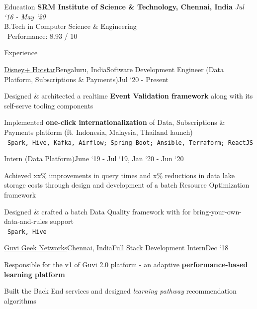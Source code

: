 \documentclass{resume}
\begin{document}
  \begin{rSection}{Education}
    {\bf SRM Institute of Science \& Technology, Chennai, India} \hfill {\em Jul `16 - May `20} \\ 
    { B.Tech in Computer Science \& Engineering } \\
    \textbullet\ Performance: 8.93 / 10
    
  \end{rSection}
  
  \begin{rSection}{Experience}
  
    \begin{rSubsection}{\href{https://tech.hotstar.com/}{Disney+ Hotstar}}{Bengaluru, India}{Software Development Engineer (Data Platform, Subscriptions \& Payments)}{Jul `20 - Present}
      \item Designed \& architected a realtime \textbf{Event Validation framework} along with its self-serve tooling components
      \item Implemented \textbf{one-click internationalization} of Data, Subscriptions \& Payments platform (ft. Indonesia, Malaysia, Thailand launch)\\
    \textbullet\ \texttt{Spark, Hive, Kafka, Airflow; Spring Boot; Ansible, Terraform; ReactJS}
    \end{rSubsection}
    
    \vspace*{-\baselineskip}

    \begin{rSubsection}{}{}{Intern (Data Platform)}{June `19 - Jul `19, Jan `20 - Jun `20}
    \item Achieved xx\% improvements in query times and x\% reductions in data lake storage costs through design and development of a batch Resource Optimization framework
    \item Designed \& crafted a batch Data Quality framework with for bring-your-own-data-and-rules support\\
    \textbullet\ \texttt{Spark, Hive}
    \end{rSubsection}

    \begin{rSubsection}{\href{https://www.guvi.in/}{Guvi Geek Networks}}{Chennai, India}{Full Stack Development Intern}{Dec `18}
    \item[] Responsible for the v1 of Guvi 2.0 platform - an adaptive \textbf{performance-based learning platform}
    \item Built the Back End services and designed \textit{learning pathway} recommendation algorithms
    \end{rSubsection}
    \vspace*{-\baselineskip}


\end{rSection}
\end{document}
